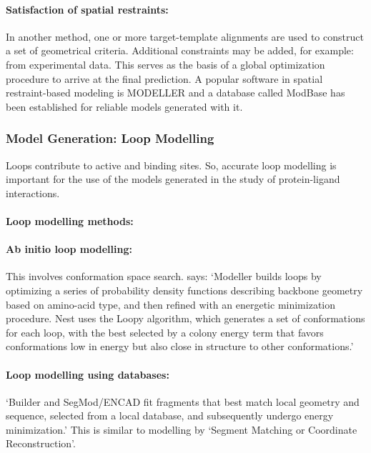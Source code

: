 \documentclass[10pt]{report}
\begin{document}
\paragraph{Satisfaction of spatial restraints:} In another method, one or more target-template alignments are used to construct a set of geometrical criteria. Additional constraints may be added, for example: from experimental data. This serves as the basis of a global optimization procedure to arrive at the final prediction. \cite{sali93, john2003com, galperin03} A popular software in spatial restraint-based modeling is MODELLER and a database called ModBase has been established for reliable models generated with it. \cite{pieper2004mod}

\subsubsection{Model Generation: Loop Modelling}

Loops contribute to active and binding sites. So, accurate loop modelling is important for the use of the models generated in the study of protein-ligand interactions. \cite{marti-renom2000com}

\paragraph{Loop modelling methods:}

\paragraph{Ab initio loop modelling:} This involves conformation space search. \cite{dalton07} says: `Modeller builds loops by optimizing a series of probability density functions describing backbone geometry based on amino-acid type, and then refined with an energetic minimization procedure. Nest uses the Loopy algorithm, which generates a set of conformations for each loop, with the best selected by a colony energy term that favors conformations low in energy but also close in structure to other conformations.'

\paragraph{Loop modelling using databases:} `Builder and SegMod/ENCAD fit fragments that best match local geometry and sequence, selected from a local database, and subsequently undergo energy minimization.' \cite{dalton07} This is similar to modelling by `Segment Matching or Coordinate Reconstruction'.
\end{document}
